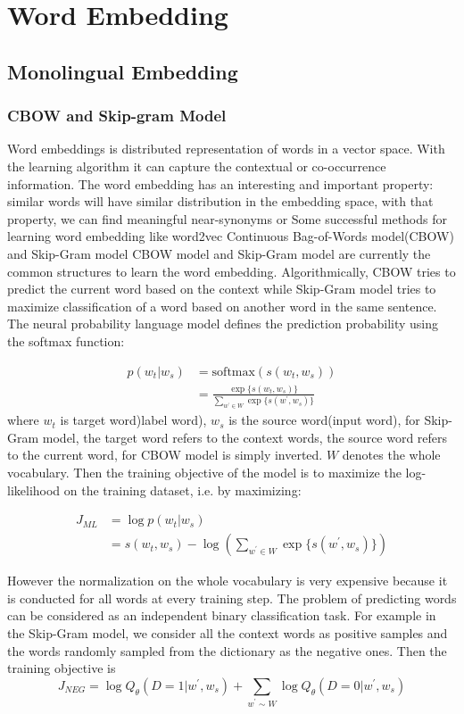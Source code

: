\chapter{Word Embedding}
\cite{xing2015normalized}
\section{Monolingual Embedding}
\subsection{CBOW and Skip-gram Model}
	Word embeddings is distributed representation of words in a vector space. With the learning algorithm it can capture the contextual or co-occurrence information. The word embedding has an interesting and important property: similar words will have similar distribution in the embedding space, with that property, we can find meaningful near-synonyms or  Some successful methods for learning word embedding like word2vec  \cite{mikolov2013distributed}
	Continuous Bag-of-Words model(CBOW) and Skip-Gram model
	CBOW model and Skip-Gram model are currently the  common structures to learn the word embedding. Algorithmically,  CBOW tries to predict the current word based on the context while Skip-Gram model tries to maximize classification of a word based on another word in the same sentence.
	The neural probability language model defines the prediction probability using the softmax function:

	
	\begin{align}
	p(w_t | w_s) & = \textrm{softmax} {(s(w_t, w_s))} \\
	& = \frac{\exp\{s(w_t, w_s)\}}{\sum_{w^{\prime} \in W}{\exp\{s( w^{\prime}, w_s)\}}} 
	\end{align}
	where ${w_t}$ is target word)label word), ${w_s}$ is the source word(input word), for Skip-Gram model, the target word refers to the context words, the source word refers to the current word, for CBOW model is simply inverted. ${W}$ denotes the whole vocabulary. Then the training objective of the model is to maximize the log-likelihood on the training dataset, i.e. by maximizing:
	
	\begin{align}
	J_{ML} & = \log p(w_t| w_s)	\\
	& = s(w_t, w_s) - \log(\sum_{w^\prime \in W} {\exp\{s(w^\prime, w_s)\}})	
	\end{align}


	
	However the normalization on the whole vocabulary is very expensive because it is conducted for all words at every training step. The problem of predicting words can be considered as an independent binary classification task. For example in the Skip-Gram model, we consider all the context words as positive samples and the words randomly sampled from the dictionary as the negative ones. Then the training objective is 
	\[J_{NEG} = \log {Q_{\theta}{(D=1 | w^{\prime}, w_s)}} + \sum_{w^{\prime} \sim W} {\log{Q_{\theta}{(D=0 | w^{\prime}, w_s )}}}  \]
	
